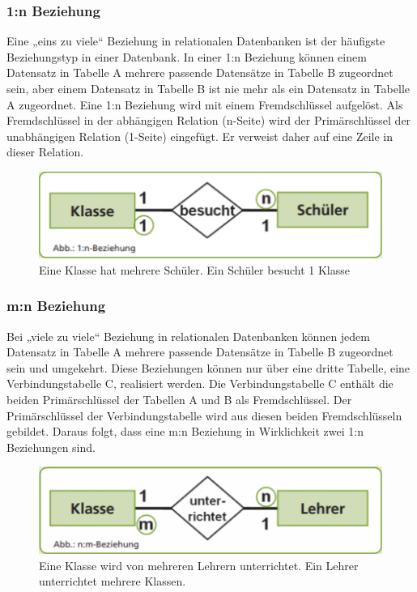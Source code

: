  \subsubsection{1:n Beziehung}

 Eine „eins zu viele“ Beziehung in relationalen Datenbanken ist der häufigste Beziehungstyp in einer Datenbank. In einer 1:n Beziehung können einem Datensatz in Tabelle A mehrere passende Datensätze in Tabelle B zugeordnet sein, aber einem Datensatz in Tabelle B ist nie mehr als ein Datensatz in Tabelle A zugeordnet. Eine 1:n Beziehung wird mit einem Fremdschlüssel aufgelöst.
Als Fremdschlüssel in der abhängigen Relation (n-Seite) wird der Primärschlüssel der unabhängigen Relation (1-Seite) eingefügt. Er verweist daher auf eine Zeile in dieser Relation.

\begin{figure}[h]
    \centering
    \includegraphics[width=.8\textwidth]{Content/images/modellierung/1n.png}
    \caption{Eine Klasse hat mehrere Schüler. Ein Schüler besucht 1 Klasse}
    \label{fig:modellierung:1n}
 \end{figure}

 \subsubsection{m:n Beziehung}

 Bei „viele zu viele“ Beziehung in relationalen Datenbanken können jedem Datensatz in Tabelle A mehrere passende Datensätze in Tabelle B zugeordnet sein und umgekehrt. Diese Beziehungen können nur über eine dritte Tabelle, eine Verbindungstabelle C, realisiert werden. Die Verbindungstabelle C enthält die beiden Primärschlüssel der Tabellen A und B als Fremdschlüssel. Der Primärschlüssel der Verbindungstabelle wird aus diesen beiden Fremdschlüsseln gebildet. Daraus folgt, dass eine m:n Beziehung in Wirklichkeit zwei 1:n Beziehungen sind.

\begin{figure}[h]
    \centering
    \includegraphics[width=.8\textwidth]{Content/images/modellierung/mn.png}
    \caption{Eine Klasse wird von mehreren Lehrern unterrichtet. Ein Lehrer unterrichtet mehrere Klassen.}
    \label{fig:modellierung:mn}
\end{figure}

